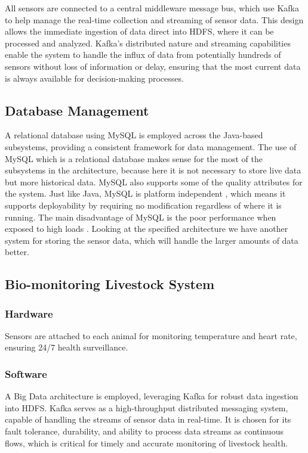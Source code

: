 \documentclass[conference]{IEEEtran}
\begin{document}
All sensors are connected to a central middleware message bus, which use Kafka to help manage the real-time collection and streaming of sensor data. This design allows the immediate ingestion of data direct into HDFS, where it can be processed and analyzed. Kafka’s distributed nature and streaming capabilities enable the system to handle the influx of data from potentially hundreds of sensors without loss of information or delay, ensuring that the most current data is always available for decision-making processes.

\subsection{Database Management}
A relational database using MySQL is employed across the Java-based subsystems, providing a consistent framework for data management.
The use of MySQL which is a relational database makes sense for the most of the subsystems in the architecture, because here it is not necessary to store live data but more historical data. MySQL also supports some of the quality attributes for the system. Just like Java, MySQL is platform independent \cite{Blue}, which means it supports deployability by requiring no modification regardless of where it is running.
The main disadvantage of MySQL is the poor performance when exposed to high loads \cite{Blue}. Looking at the specified architecture we have another system for storing the sensor data, which will handle the larger amounts of data better.

\subsection{Bio-monitoring Livestock System}
\subsubsection{Hardware}
Sensors are attached to each animal for monitoring temperature and heart rate, ensuring 24/7 health surveillance.
\subsubsection{Software}
A Big Data architecture is employed, leveraging Kafka for robust data ingestion into HDFS. Kafka serves as a high-throughput distributed messaging system, capable of handling the streams of sensor data in real-time. It is chosen for its fault tolerance, durability, and ability to process data streams as continuous flows, which is critical for timely and accurate monitoring of livestock health.
\end{document}
